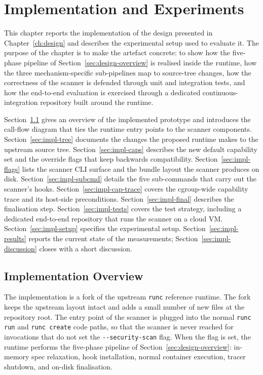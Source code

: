 
\chapter{Implementation and Experiments}\label{ch:impl}

This chapter reports the implementation of the design presented in Chapter~\ref{ch:design} and describes the experimental setup used to evaluate it. The purpose of the chapter is to make the artefact concrete: to show how the five-phase pipeline of Section~\ref{sec:design-overview} is realised inside the runtime, how the three mechanism-specific sub-pipelines map to source-tree changes, how the correctness of the scanner is defended through unit and integration tests, and how the end-to-end evaluation is exercised through a dedicated continuous-integration repository built around the runtime.

Section~\ref{sec:impl-overview} gives an overview of the implemented prototype and introduces the call-flow diagram that ties the runtime entry points to the scanner components. Section~\ref{sec:impl-tree} documents the changes the proposed runtime makes to the upstream source tree. Section~\ref{sec:impl-caps} describes the new default capability set and the override flags that keep backwards compatibility. Section~\ref{sec:impl-flags} lists the scanner CLI surface and the bundle layout the scanner produces on disk. Section~\ref{sec:impl-subcmd} details the five sub-commands that carry out the scanner's hooks. Section~\ref{sec:impl-cap-trace} covers the cgroup-wide capability trace and its host-side preconditions. Section~\ref{sec:impl-final} describes the finalisation step. Section~\ref{sec:impl-tests} covers the test strategy, including a dedicated end-to-end repository that runs the scanner on a cloud VM. Section~\ref{sec:impl-setup} specifies the experimental setup. Section~\ref{sec:impl-results} reports the current state of the measurements; Section~\ref{sec:impl-discussion} closes with a short discussion.

\section{Implementation Overview}\label{sec:impl-overview}

The implementation is a fork of the upstream \texttt{runc} reference runtime. The fork keeps the upstream layout intact and adds a small number of new files at the repository root. The entry point of the scanner is plugged into the normal \texttt{runc run} and \texttt{runc create} code paths, so that the scanner is never reached for invocations that do not set the \texttt{-{}-security-scan} flag. When the flag is set, the runtime performs the five-phase pipeline of Section~\ref{sec:design-overview}: in-memory spec relaxation, hook installation, normal container execution, tracer shutdown, and on-disk finalisation.

